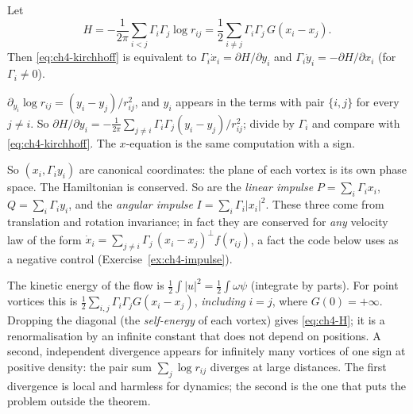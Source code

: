\begin{proposition}\label{prop:ch4-ham}
Let
\begin{equation}\label{eq:ch4-H}
H = -\frac{1}{2\pi}\sum_{i<j}\Gamma_i\Gamma_j\log r_{ij}
  = \frac12\sum_{i\neq j}\Gamma_i\Gamma_j\,G(x_i-x_j).
\end{equation}
Then \eqref{eq:ch4-kirchhoff} is equivalent to
$\Gamma_i\dot x_i = \partial H/\partial y_i$ and $\Gamma_i\dot y_i = -\partial H/\partial x_i$ (for $\Gamma_i\ne0$).
\end{proposition}
\begin{humanproof}
$\partial_{y_i}\log r_{ij} = (y_i-y_j)/r_{ij}^2$, and $y_i$ appears in the terms with pair $\{i,j\}$ for every
$j\neq i$. So $\partial H/\partial y_i = -\frac{1}{2\pi}\sum_{j\ne i}\Gamma_i\Gamma_j(y_i-y_j)/r_{ij}^2$; divide by
$\Gamma_i$ and compare with \eqref{eq:ch4-kirchhoff}. The $x$-equation is the same computation with a sign.
\end{humanproof}

So $(x_i,\Gamma_i y_i)$ are canonical coordinates: the plane of each vortex is its own phase space. The
Hamiltonian is conserved. So are the \emph{linear impulse} $P=\sum_i\Gamma_i x_i$, $Q=\sum_i\Gamma_i y_i$, and
the \emph{angular impulse} $I=\sum_i\Gamma_i|x_i|^2$. These three come from translation and rotation invariance;
in fact they are conserved for \emph{any} velocity law of the form
$\dot x_i = \sum_{j\neq i}\Gamma_j\,(x_i-x_j)^{\perp} f(r_{ij})$, a fact the code below uses as a negative control
(Exercise~\ref{ex:ch4-impulse}).

\begin{remark}\label{rem:ch4-divergences}
The kinetic energy of the flow is $\frac12\int|u|^2 = \frac12\int\omega\psi$ (integrate by parts). For point
vortices this is
$\frac12\sum_{i,j}\Gamma_i\Gamma_jG(x_i-x_j)$, \emph{including} $i=j$, where $G(0)=+\infty$. Dropping the
diagonal (the \emph{self-energy} of each vortex) gives \eqref{eq:ch4-H}; it is a renormalisation by an infinite
constant that does not depend on positions. A second, independent divergence appears for infinitely many vortices
of one sign at positive density: the pair sum $\sum_{j}\log r_{ij}$ diverges at large distances. The first
divergence is local and harmless for dynamics; the second is the one that puts the problem outside the theorem.
\end{remark}

